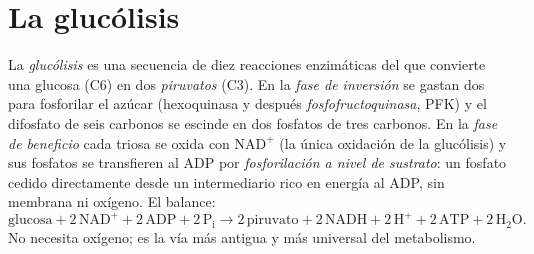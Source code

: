 \section{La glucólisis}

\begin{definition}[Glucólisis]\label{def:b1:respiration-fermentation:glycolysis}
La \emph{glucólisis} es una secuencia de diez reacciones enzimáticas del
 que convierte una glucosa (C6) en dos \emph{piruvatos} (C3). En la
\emph{fase de inversión} se gastan dos  para fosforilar el azúcar
(hexoquinasa y después \emph{fosfofructoquinasa}, PFK) y el difosfato de
seis carbonos se escinde en dos fosfatos de tres carbonos. En la \emph{fase
de beneficio} cada triosa se oxida con $\mathrm{NAD^+}$ (la única oxidación
de la glucólisis) y sus fosfatos se transfieren al ADP por
\emph{fosforilación a nivel de sustrato}: un fosfato cedido directamente desde un intermediario rico en
energía al ADP, sin membrana ni oxígeno. El balance:
\[
\text{glucosa} + 2\,\mathrm{NAD^+} + 2\,\mathrm{ADP} + 2\,\mathrm{P_i}
\to 2\,\text{piruvato} + 2\,\mathrm{NADH} + 2\,\mathrm{H^+} + 2\,\mathrm{ATP} + 2\,\mathrm{H_2O} .
\]
No necesita oxígeno; es la vía más antigua y más universal del
metabolismo.
\end{definition}

